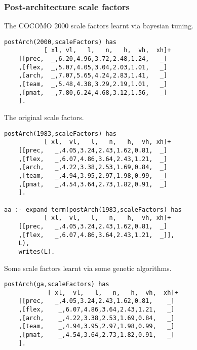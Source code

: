\subsubsection{ Post-architecture scale factors
}
 The COCOMO 2000 scale factors learnt
via bayesian tuning. 
\begin{Verbatim}
postArch(2000,scaleFactors) has
           [ xl, vl,   l,   n,   h,  vh,  xh]+
    [[prec,  _,6.20,4.96,3.72,2.48,1.24,   _]
    ,[flex,  _,5.07,4.05,3.04,2.03,1.01,   _]
    ,[arch,  _,7.07,5.65,4.24,2.83,1.41,   _]
    ,[team,  _,5.48,4.38,3.29,2.19,1.01,   _]
    ,[pmat,  _,7.80,6.24,4.68,3.12,1.56,   _]
    ].
\end{Verbatim}
 The original scale factors. 
\begin{Verbatim}
postArch(1983,scaleFactors) has
           [ xl,  vl,   l,   n,   h,  vh, xh]+
    [[prec,   _,4.05,3.24,2.43,1.62,0.81,  _]
    ,[flex,   _,6.07,4.86,3.64,2.43,1.21,  _]
    ,[arch,   _,4.22,3.38,2.53,1.69,0.84,  _]
    ,[team,   _,4.94,3.95,2.97,1.98,0.99,  _]
    ,[pmat,   _,4.54,3.64,2.73,1.82,0.91,  _]
    ].

aa :- expand_term(postArch(1983,scaleFactors) has
           [ xl,  vl,   l,   n,   h,  vh, xh]+
    [[prec,   _,4.05,3.24,2.43,1.62,0.81,  _]
    ,[flex,   _,6.07,4.86,3.64,2.43,1.21,  _]],
	L),
	writes(L).
\end{Verbatim}
 Some scale factors learnt via some
genetic algorithms. 
\begin{Verbatim}
postArch(ga,scaleFactors) has
            [ xl,  vl,   l,   n,   h,  vh,  xh]+
    [[prec,   _,4.05,3.24,2.43,1.62,0.81,    _]
    ,[flex,    _,6.07,4.86,3.64,2.43,1.21,   _]
    ,[arch,    _,4.22,3.38,2.53,1.69,0.84,   _]
    ,[team,    _,4.94,3.95,2.97,1.98,0.99,   _]
    ,[pmat,    _,4.54,3.64,2.73,1.82,0.91,   _]
    ].
\end{Verbatim}
